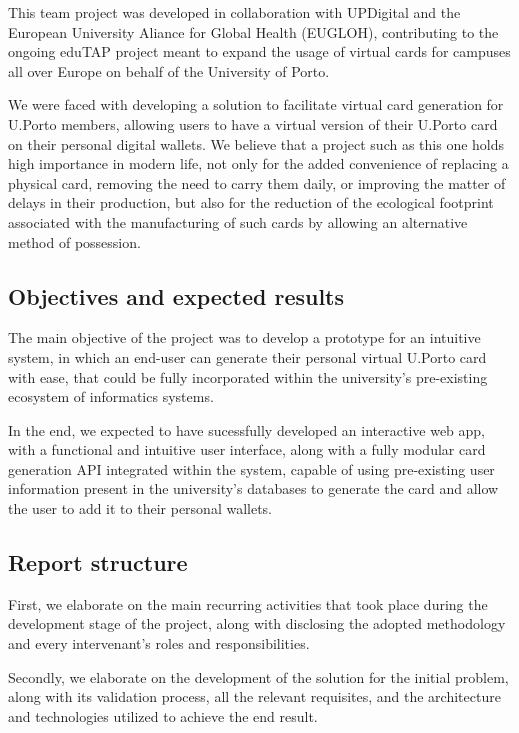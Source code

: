 \documentclass[12pt]{article}
\begin{document}
This team project was developed in collaboration with UPDigital and the European University Aliance for Global
Health (EUGLOH\cite{eugloh}), contributing to the ongoing eduTAP project meant to expand the usage of virtual
cards for campuses all over Europe on behalf of the University of Porto.

We were faced with developing a solution to facilitate virtual card generation for U.Porto members, allowing users
to have a virtual version of their U.Porto card on their personal digital wallets. We believe that a project such as
this one holds high importance in modern life, not only for the added convenience of replacing a physical card,
removing the need to carry them daily, or improving the matter of delays in their production, but also for the
reduction of the ecological footprint associated with the manufacturing of such cards by allowing an alternative method of possession.

\subsection{Objectives and expected results}

The main objective of the project was to develop a prototype for an intuitive system, in which an end-user can generate their
personal virtual U.Porto card with ease, that could be fully incorporated within the university's pre-existing ecosystem of
informatics systems.

In the end, we expected to have sucessfully developed an interactive web app, with a functional and intuitive user interface,
along with a fully modular card generation API integrated within the system, capable of using pre-existing user information
present in the university's databases to generate the card and allow the user to add it to their personal wallets.

\subsection{Report structure}

First, we elaborate on the main recurring activities that took place during the development stage of the project, along
with disclosing the adopted methodology and every intervenant's roles and responsibilities.

Secondly, we elaborate on the development of the solution for the initial problem, along with its validation process, all
the relevant requisites, and the architecture and technologies utilized to achieve the end result.
\end{document}
